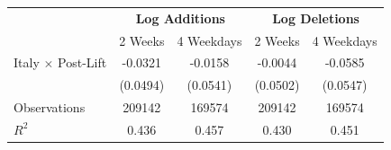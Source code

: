 \begin{tabular}{l|cc|cc}
\hline \hline
 & \multicolumn{2}{c|}{\textbf{Log Additions}} & \multicolumn{2}{c}{\textbf{Log Deletions}} \\
 & 2 Weeks & 4 Weekdays & 2 Weeks & 4 Weekdays \\
\hline
Italy $\times$ Post-Lift & -0.0321 & -0.0158 & -0.0044 & -0.0585 \\
 & (0.0494) & (0.0541) & (0.0502) & (0.0547) \\
\hline
Observations & 209142 & 169574 & 209142 & 169574 \\
$R^2$ & 0.436 & 0.457 & 0.430 & 0.451 \\
\hline \hline
\end{tabular}
